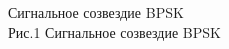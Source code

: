 \documentclass[a4paper,12pt]{article}
\begin{document}
\begin{enumerate}

{\item Сигнальное созвездие BPSK
	 \\ Рис.1 Сигнальное созвездие BPSK
	
	\\}


\end{enumerate}
\end{document}
